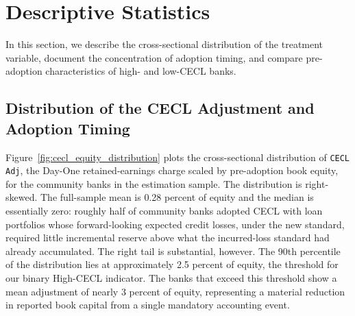 
\section{Descriptive Statistics}
\label{sec:descriptive}

In this section, we describe the cross-sectional distribution of the treatment
variable, document the concentration of adoption timing, and compare pre-adoption
characteristics of high- and low-CECL banks.

\subsection{Distribution of the CECL Adjustment and Adoption Timing}
\label{sec:descriptive:distribution}

Figure~\ref{fig:cecl_equity_distribution} plots the cross-sectional distribution
of \texttt{CECL Adj}, the Day-One retained-earnings charge scaled by pre-adoption
book equity, for the community banks in the estimation sample.  The
distribution is right-skewed.  The full-sample mean is 0.28 percent of equity and
the median is essentially zero: roughly half of community banks adopted CECL with
loan portfolios whose forward-looking expected credit losses, under the new
standard, required little incremental reserve above what the incurred-loss
standard had already accumulated.  The right tail is substantial, however.  The
90th percentile of the distribution lies at approximately 2.5 percent of equity,
the threshold for our binary High-CECL indicator.  The banks that exceed
this threshold show a mean adjustment of nearly 3 percent of equity,
representing a material reduction in reported book capital from a single
mandatory accounting event.

